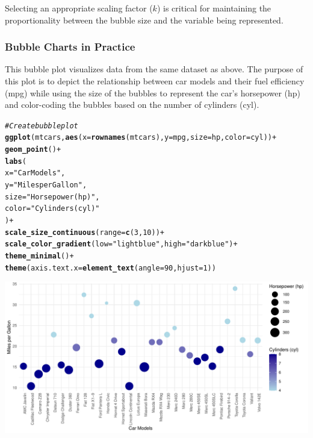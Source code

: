 \documentclass{article}\usepackage[]{graphicx}\usepackage[]{xcolor}
\makeatletter
\def\maxwidth{ %
  \ifdim\Gin@nat@width>\linewidth
    \linewidth
  \else
    \Gin@nat@width
  \fi
}
\newcommand{\hlnum}[1]{\textcolor[rgb]{0.686,0.059,0.569}{#1}}%
\newcommand{\hlstr}[1]{\textcolor[rgb]{0.192,0.494,0.8}{#1}}%
\newcommand{\hlcom}[1]{\textcolor[rgb]{0.678,0.584,0.686}{\textit{#1}}}%
\newcommand{\hlopt}[1]{\textcolor[rgb]{0,0,0}{#1}}%
\newcommand{\hlstd}[1]{\textcolor[rgb]{0.345,0.345,0.345}{#1}}%
\newcommand{\hlkwc}[1]{\textcolor[rgb]{0.333,0.667,0.333}{#1}}%
\newcommand{\hlkwd}[1]{\textcolor[rgb]{0.737,0.353,0.396}{\textbf{#1}}}%
\newenvironment{kframe}{%
 \def\at@end@of@kframe{}%
 \ifinner\ifhmode%
  \def\at@end@of@kframe{\end{minipage}}%
  \begin{minipage}{\columnwidth}%
 \fi\fi%
 \def\FrameCommand##1{\hskip\@totalleftmargin \hskip-\fboxsep
 \colorbox{shadecolor}{##1}\hskip-\fboxsep
     \hskip-\linewidth \hskip-\@totalleftmargin \hskip\columnwidth}%
 \MakeFramed {\advance\hsize-\width
   \@totalleftmargin\z@ \linewidth\hsize
   \@setminipage}}%
 {\par\unskip\endMakeFramed%
 \at@end@of@kframe}
\newenvironment{knitrout}{}{} %
\makeatother
\begin{document}
Selecting an appropriate scaling factor (\(k\)) is critical for maintaining the proportionality between the bubble size and the variable being represented.

\subsubsection{Bubble Charts in Practice}
 This bubble plot visualizes data from the same dataset as above. The purpose of this plot is to depict the relationship between car models and their fuel efficiency (mpg) while using the size of the bubbles to represent the car's horsepower (hp) and color-coding the bubbles based on the number of cylinders (cyl).

\begin{knitrout}
\color{fgcolor}\begin{kframe}
\begin{alltt}
\hlcom{#Create bubble plot }
\hlkwd{ggplot}\hlstd{(mtcars,} \hlkwd{aes}\hlstd{(}\hlkwc{x} \hlstd{=} \hlkwd{rownames}\hlstd{(mtcars),} \hlkwc{y} \hlstd{= mpg,} \hlkwc{size} \hlstd{= hp,} \hlkwc{color} \hlstd{= cyl))} \hlopt{+}
  \hlkwd{geom_point}\hlstd{()} \hlopt{+}
  \hlkwd{labs}\hlstd{(}
    \hlkwc{x} \hlstd{=} \hlstr{"Car Models"}\hlstd{,}
    \hlkwc{y} \hlstd{=} \hlstr{"Miles per Gallon"}\hlstd{,}
    \hlkwc{size} \hlstd{=} \hlstr{"Horsepower (hp)"}\hlstd{,}
    \hlkwc{color} \hlstd{=} \hlstr{"Cylinders (cyl)"}
  \hlstd{)} \hlopt{+}
  \hlkwd{scale_size_continuous}\hlstd{(}\hlkwc{range} \hlstd{=} \hlkwd{c}\hlstd{(}\hlnum{3}\hlstd{,} \hlnum{10}\hlstd{))} \hlopt{+}
  \hlkwd{scale_color_gradient}\hlstd{(}\hlkwc{low} \hlstd{=} \hlstr{"lightblue"}\hlstd{,} \hlkwc{high} \hlstd{=} \hlstr{"darkblue"}\hlstd{)} \hlopt{+}
  \hlkwd{theme_minimal}\hlstd{()} \hlopt{+}
  \hlkwd{theme}\hlstd{(}\hlkwc{axis.text.x} \hlstd{=} \hlkwd{element_text}\hlstd{(}\hlkwc{angle} \hlstd{=} \hlnum{90}\hlstd{,} \hlkwc{hjust} \hlstd{=}\hlnum{1}\hlstd{))}
\end{alltt}
\end{kframe}
\includegraphics[width=\maxwidth]{figure/buble-plot-chunk-1} 
\end{knitrout}
\end{document}
